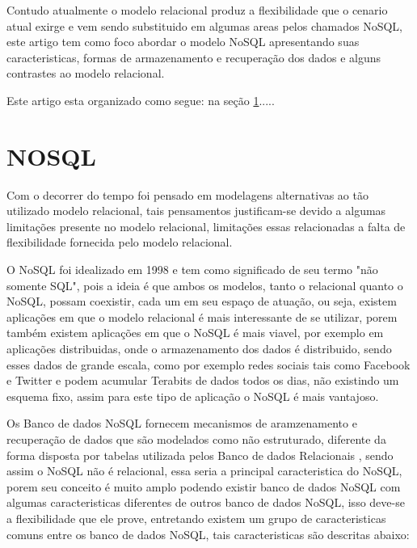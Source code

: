 \documentclass[12pt]{article}
\begin{document}
Contudo atualmente o modelo relacional produz a flexibilidade que o cenario atual exirge e vem sendo substituido em algumas areas pelos chamados NoSQL, este artigo tem como foco abordar o modelo NoSQL apresentando suas caracteristicas, formas de armazenamento e recuperação dos dados e alguns contrastes ao modelo relacional.

Este artigo esta organizado como segue: na seção \ref{sec:nosql}.....


\section{NOSQL} 
\label{sec:nosql}

Com o decorrer do tempo foi pensado em modelagens alternativas ao tão utilizado modelo relacional, tais pensamentos justificam-se devido a algumas limitações presente no modelo relacional, limitações essas relacionadas a falta de flexibilidade fornecida pelo modelo relacional.

O NoSQL foi idealizado em 1998 e tem como significado de seu termo "não somente SQL", pois a ideia é que ambos os modelos, tanto o relacional quanto o NoSQL, possam coexistir, cada um em seu espaço de atuação, ou seja, existem aplicações em que o modelo relacional é mais interessante de se utilizar, porem também existem aplicações em que o NoSQL é mais viavel, por exemplo em aplicações distribuidas, onde o armazenamento dos dados é distribuido, sendo esses dados de grande escala, como por exemplo redes sociais tais como Facebook e Twitter e podem acumular Terabits de dados todos os dias, não existindo um esquema fixo, assim para este tipo de aplicação o NoSQL é mais vantajoso.\cite{gueidi:2016} 

Os Banco de dados NoSQL fornecem mecanismos de aramzenamento e recuperação de dados que são modelados como não estruturado, diferente da forma disposta por tabelas utilizada pelos Banco de dados Relacionais \cite{zhaoSchema:2014}, sendo assim o NoSQL não é relacional, essa seria a principal caracteristica do NoSQL, porem seu conceito é muito amplo podendo existir banco de dados NoSQL com algumas caracteristicas diferentes de outros banco de dados NoSQL, isso deve-se a flexibilidade que ele prove, entretando existem um grupo de caracteristicas comuns entre os banco de dados NoSQL, tais caracteristicas são descritas abaixo:
\end{document}
